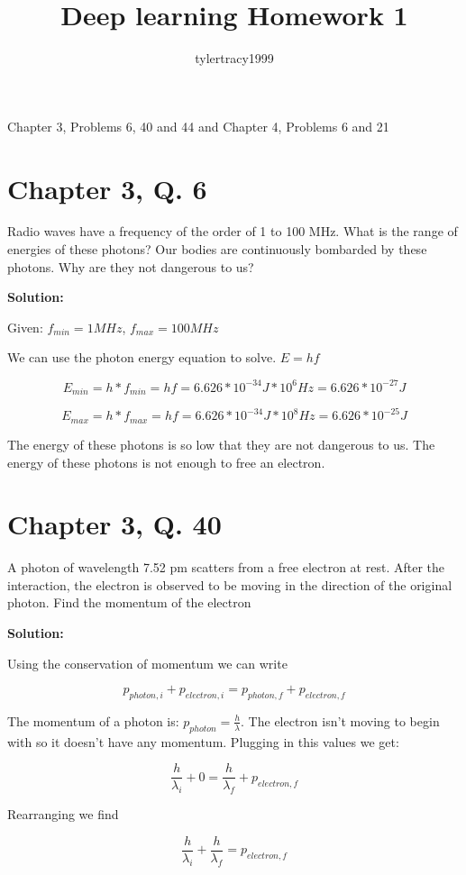 \documentclass{article}
\title{Deep learning Homework 1}
\author{tylertracy1999 }
\begin{document}
\maketitle

Chapter 3, Problems 6, 40 and 44  and Chapter 4, Problems 6 and 21


\section*{Chapter 3, Q. 6}

Radio waves have a frequency of the order of 1 to 100 MHz.  What is the range of energies of these photons? Our bodies are continuously bombarded by these photons. Why are they not dangerous to us?

\textbf{Solution:}

Given: $f_{min} = 1MHz$,  $f_{max} = 100MHz$

We can use the photon energy equation to solve. $ E = hf $

$$ E_{min} = h * f_{min} = hf = 6.626 * 10^{-34}J * 10^6 Hz = 6.626 * 10^{-27} J $$

$$ E_{max} = h * f_{max} = hf = 6.626 * 10^{-34}J * 10^8 Hz = 6.626 * 10^{-25} J $$

The energy of these photons is so low that they are not dangerous to us. The energy of these photons is not enough to free an electron.

\section*{Chapter 3, Q. 40}

A photon of wavelength 7.52 pm scatters from a free electron at rest. After the interaction, the electron is observed to be moving in the direction of the original photon. Find the momentum of the electron

\textbf{Solution:}

Using the conservation of momentum we can write

$$ p_{photon,i} + p_{electron,i} = p_{photon,f} + p_{electron,f} $$

The momentum of a photon is: $ p_{photon} = \frac{h}{\lambda} $. The electron isn't moving to begin with so it doesn't have any momentum. Plugging in this values we get:

$$ \frac{h}{\lambda_i} + 0 = \frac{h}{\lambda_f} + p_{electron,f} $$

Rearranging we find

$$ \frac{h}{\lambda_i} + \frac{h}{\lambda_f} = p_{electron,f} $$
\end{document}
